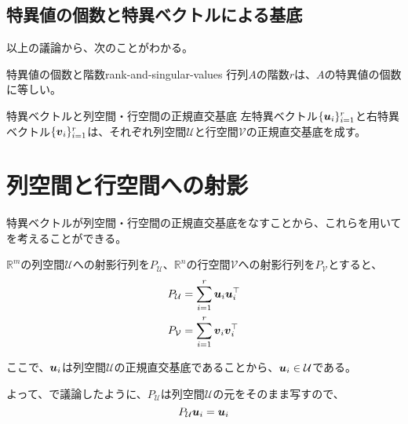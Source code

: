 \documentclass[../../../topic_linear-algebra]{subfiles}
\begin{document}
\subsection{特異値の個数と特異ベクトルによる基底}

以上の議論から、次のことがわかる。

\begin{theorem}{特異値の個数と階数}{rank-and-singular-values}
  行列$A$の階数$r$は、$A$の特異値の個数に等しい。
\end{theorem}

\begin{theorem*}{特異ベクトルと列空間・行空間の正規直交基底}
  左特異ベクトル$\{\vb*{u}_i\}_{i=1}^r$と右特異ベクトル$\{\vb*{v}_i\}_{i=1}^r$は、それぞれ列空間$\mathcal{U}$と行空間$\mathcal{V}$の正規直交基底を成す。
\end{theorem*}

\sectionline
\section{列空間と行空間への射影}

特異ベクトルが列空間・行空間の正規直交基底をなすことから、これらを用いてを考えることができる。

\br

$\mathbb{R}^m$の列空間$\mathcal{U}$への射影行列を$P_{\mathcal{U}}$、$\mathbb{R}^n$の行空間$\mathcal{V}$への射影行列を$P_{\mathcal{V}}$とすると、
\begin{align*}
  P_{\mathcal{U}} & = \sum_{i=1}^r \vb*{u}_i \vb*{u}_i^\top \\
  P_{\mathcal{V}} & = \sum_{i=1}^r \vb*{v}_i \vb*{v}_i^\top
\end{align*}

\br

ここで、$\vb*{u}_i$は列空間$\mathcal{U}$の正規直交基底であることから、$\vb*{u}_i \in \mathcal{U}$である。

よって、で議論したように、$P_{\mathcal{U}}$は列空間$\mathcal{U}$の元をそのまま写すので、
\begin{equation*}
  P_{\mathcal{U}}\vb*{u}_i = \vb*{u}_i
\end{equation*}
\end{document}
